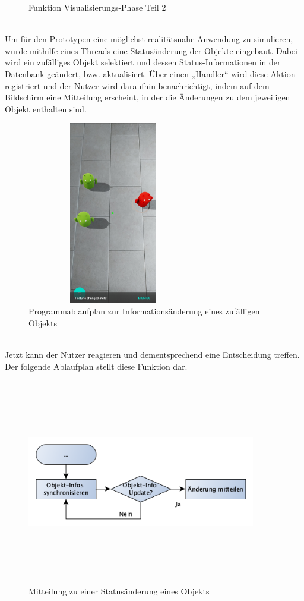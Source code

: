 \begin{figure}[hbt!]
    \caption{Funktion Visualisierungs-Phase Teil 2}
    \label{pic:showdatatoobj}
\end{figure}
\pagebreak
\\
Um für den Prototypen eine möglichst realitätsnahe Anwendung zu simulieren, wurde mithilfe eines Threads eine Statusänderung der Objekte eingebaut. Dabei wird 
ein zufälliges Objekt selektiert und dessen Status-Informationen in der Datenbank geändert, bzw. aktualisiert. Über einen „Handler“ wird diese Aktion registriert 
und der Nutzer wird daraufhin benachrichtigt, indem auf dem Bildschirm eine Mitteilung erscheint, in der die Änderungen zu dem jeweiligen Objekt 
enthalten sind. 
\begin{figure}[hbt!]
    \centering
    \includegraphics[width=7.5cm,height=8cm,keepaspectratio]{4Umsetzung/Bilder/changeState.jpeg}
    \caption{Programmablaufplan zur Informationsänderung eines zufälligen Objekts}
    \label{pic:startmenu}
\end{figure}
\\
Jetzt kann der Nutzer reagieren und dementsprechend eine Entscheidung treffen. 
\\
Der folgende Ablaufplan stellt diese Funktion dar.
\begin{figure}[hbt!]
    \centering
    \includegraphics[width=10cm,height=9cm,keepaspectratio]{4Umsetzung/Bilder/changeInfoPAP.png}
    \caption{Mitteilung zu einer Statusänderung eines Objekts}
    \label{pic:startmenu}
\end{figure}
